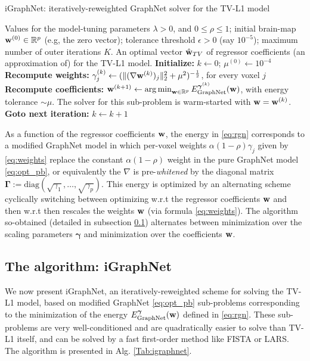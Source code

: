 \begin{algorithm}
\caption{iGraphNet: iteratively-reweighted GraphNet solver for the
  TV-L1 model}
\label{Tab:igraphnet}
\begin{algorithmic}[1]
\Require Values for the model-tuning parameters
  $\lambda > 0$, and $0 \le \rho \le 1$; initial brain-map $\mathbf{w}^{(0)}
  \in \mathbb R^p$ (e.g, the zero vector); tolerance threshold
  $\epsilon > 0$ (say $10^{-5}$); maximum number of outer iterations
  $K$.
\Ensure An optimal vector $\hat{\mathbf{w}}_{TV}$ of regressor coefficients (an approximation of)
for the TV-L1 model.
\State  \textbf{Initialize:} $k \leftarrow 0$; $\mu^{(0)} \leftarrow 10^{-4}$
\State \textbf{Recompute weights:} $\gamma_j^{(k)} \leftarrow (\|(\nabla
\mathbf{w}^{(k)})_j\|_2^2 + {\mu}^2)^{-\frac{1}{2}}$, for every voxel $j$
\State  \textbf{Recompute coefficients:} $\mathbf{w}^{(k + 1)}
  \leftarrow \operatorname*{arg\,min}_{\mathbf{w} \in \mathbb R^p}
  E_{\text{GraphNet}}^{\boldsymbol{\gamma}^{(k)}}(\mathbf{w})$, with energy
  tolerance $\sim \mu$. The solver for this sub-problem
  is warm-started with $\mathbf{w} = \mathbf{w}^{(k)}$.
\State \textbf{Goto next iteration:} $k \leftarrow k + 1$
\EndWhile
\end{algorithmic}
\end{algorithm}

As a function of the regressor coefficients $\mathbf{w}$, the energy in
\eqref{eq:rgn} corresponds to a modified
GraphNet model in which per-voxel weights $\alpha(1 - \rho)\gamma_j$ given
by \eqref{eq:weights} replace the constant $\alpha(1 - \rho)$ weight
in the pure GraphNet model \eqref{eq:opt_pb}, or
equivalently the $\nabla$ is pre-\textit{whitened} by the diagonal
matrix $\boldsymbol{\Gamma} := \mathrm{diag}(\sqrt{\gamma_1},\ldots,\sqrt{\gamma_p})$. This energy
is optimized by an alternating scheme cyclically switching between
optimizing w.r.t the regressor coefficients $\mathbf{w}$ and then w.r.t
then rescales the weights $\mathbf{w}$ (via formula \eqref{eq:weights}). The algorithm
so-obtained (detailed in subsection \ref{sec:algo}) alternates between minimization over the scaling parameters $\boldsymbol{\gamma}$ and minimization over the coefficients $\mathbf{w}$.
\subsection{The algorithm: iGraphNet}
\label{sec:algo}
We now present iGraphNet, an iteratively-reweighted scheme for
solving the TV-L1 model, based on modified GraphNet \eqref{eq:opt_pb}
sub-problems corresponding to the minimization of the energy
$E_{\text{GraphNet}}^{\boldsymbol{\gamma}}(\mathbf{w})$ defined in
\eqref{eq:rgn}. These sub-problems  are very well-conditioned and are
quadratically easier to solve than TV-L1 itself, and can be solved by
a fast first-order method like FISTA or LARS. The algorithm is presented in
Alg. \ref{Tab:igraphnet}.

